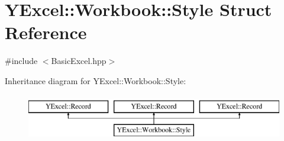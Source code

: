 \hypertarget{struct_y_excel_1_1_workbook_1_1_style}{}\section{Y\+Excel\+:\+:Workbook\+:\+:Style Struct Reference}
\label{struct_y_excel_1_1_workbook_1_1_style}


{\ttfamily \#include $<$Basic\+Excel.\+hpp$>$}

Inheritance diagram for Y\+Excel\+:\+:Workbook\+:\+:Style\+:\begin{figure}[H]
\begin{center}
\leavevmode
\includegraphics[height=2.000000cm]{struct_y_excel_1_1_workbook_1_1_style}
\end{center}
\end{figure}
